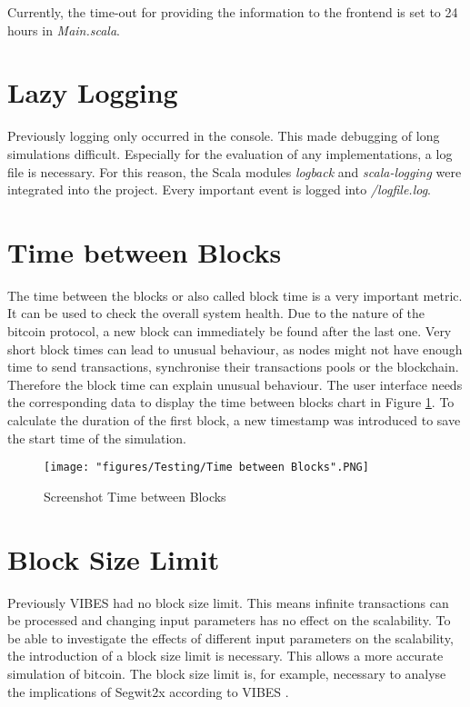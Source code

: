 Currently, the time-out for providing the information to the frontend is set to 24 hours in \textit{Main.scala}.

\section{Lazy Logging}
Previously logging only occurred in the console. This made debugging of long simulations difficult. Especially for the evaluation of any implementations, a log file is necessary. For this reason, the Scala modules \textit{logback} and \textit{scala-logging} were integrated into the project. Every important event is logged into \textit{/logfile.log}.

\section{Time between Blocks}
The time between the blocks or also called block time is a very important metric. It can be used to check the overall system health. Due to the nature of the bitcoin protocol, a new block can immediately be found after the last one. Very short block times can lead to unusual behaviour, as nodes might not have enough time to send transactions, synchronise their transactions pools or the blockchain. Therefore the block time can explain unusual behaviour. The user interface needs the corresponding data to display the time between blocks chart in Figure  \ref{fig:timeBetweenBlocks}. To calculate the duration of the first block, a new timestamp was introduced to save the start time of the simulation.

\begin{figure}[!htb]
\centering
\texttt{[image: "figures/Testing/Time between Blocks".PNG]}
\caption{Screenshot Time between Blocks
\label{fig:timeBetweenBlocks}}
\end{figure}

\section{Block Size Limit \label{subsection:blocksizelimit}}
Previously VIBES had no block size limit. This means infinite transactions can be processed and changing input parameters has no effect on the scalability. To be able to investigate the effects of different input parameters on the scalability, the introduction of a block size limit is necessary. This allows a more accurate simulation of bitcoin. The block size limit is, for example, necessary to analyse the implications of Segwit2x according to VIBES \cite{vibes}.

